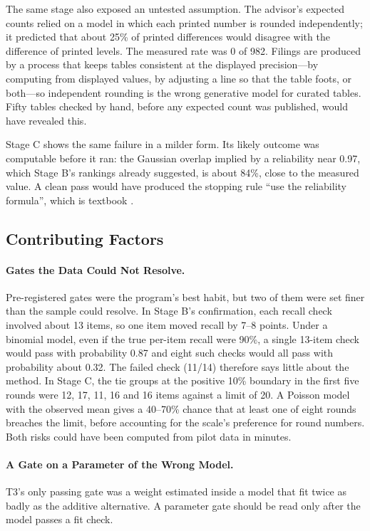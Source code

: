 \documentclass[11pt]{article}
\begin{document}
The same stage also exposed an untested assumption. The advisor's expected counts relied on a model in which each printed number is rounded independently; it predicted that about 25\% of printed differences would disagree with the difference of printed levels. The measured rate was 0 of 982. Filings are produced by a process that keeps tables consistent at the displayed precision---by computing from displayed values, by adjusting a line so that the table foots, or both---so independent rounding is the wrong generative model for curated tables. Fifty tables checked by hand, before any expected count was published, would have revealed this.

Stage C shows the same failure in a milder form. Its likely outcome was computable before it ran: the Gaussian overlap implied by a reliability near 0.97, which Stage B's rankings already suggested, is about 84\%, close to the measured value. A clean pass would have produced the stopping rule ``use the reliability formula'', which is textbook \citep{spearman1910correlation,brown1910some}.

\subsection{Contributing Factors}

\paragraph{Gates the Data Could Not Resolve.} Pre-registered gates were the program's best habit, but two of them were set finer than the sample could resolve. In Stage B's confirmation, each recall check involved about 13 items, so one item moved recall by 7--8 points. Under a binomial model, even if the true per-item recall were 90\%, a single 13-item check would pass with probability 0.87 and eight such checks would all pass with probability about 0.32. The failed check (11/14) therefore says little about the method. In Stage C, the tie groups at the positive 10\% boundary in the first five rounds were 12, 17, 11, 16 and 16 items against a limit of 20. A Poisson model with the observed mean gives a 40--70\% chance that at least one of eight rounds breaches the limit, before accounting for the scale's preference for round numbers. Both risks could have been computed from pilot data in minutes.

\paragraph{A Gate on a Parameter of the Wrong Model.} T3's only passing gate was a weight estimated inside a model that fit twice as badly as the additive alternative. A parameter gate should be read only after the model passes a fit check.
\end{document}
